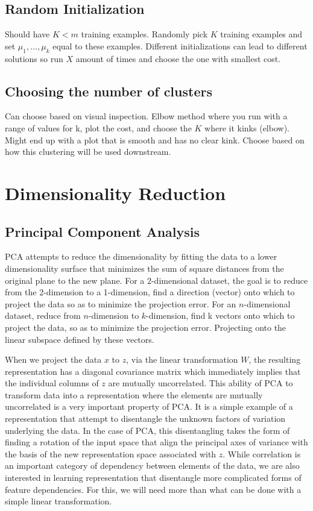 \documentclass[12pt]{article}
\begin{document}
\subsection{Random Initialization}
Should have $K<m$ training examples. Randomly pick $K$ training examples and set $\mu_1,...,\mu_k$ equal to these examples. Different initializations can lead to different solutions so run $X$ amount of times and choose the one with smallest cost.

\subsection{Choosing the number of clusters}
Can choose based on visual inspection. Elbow method where you run with a range of values for k, plot the cost, and choose the $K$ where it kinks (elbow). Might end up with a plot that is smooth and has no clear kink. Choose based on how this clustering will be used downstream.

\section{Dimensionality Reduction}
\subsection{Principal Component Analysis}
PCA attempts to reduce the dimensionality by fitting the data to a lower dimensionality surface that minimizes the sum of square distances from the original plane to the new plane. For a 2-dimensional dataset, the goal is to reduce from the 2-dimension to a 1-dimension, find a direction (vector) onto which to project the data so as to minimize the projection error. For an $n$-dimensional dataset, reduce from $n$-dimension to $k$-dimension, find k vectors onto which to project the data, so as to minimize the projection error. Projecting onto the linear subspace defined by these vectors.

When we project the data $x$ to $z$, via the linear transformation $W$, the resulting representation has a diagonal covariance matrix which immediately implies that the individual columns of $z$ are mutually uncorrelated.  This ability of PCA to transform data into a representation where the elements are mutually uncorrelated is a very important property of PCA. It is a simple example of a representation that attempt to disentangle the unknown factors of variation underlying the data. In the case of PCA, this disentangling takes the form of finding a rotation of the input space that align the principal axes of variance with the basis of the new representation space associated with $z$. While correlation is an important category of dependency between elements of the data, we are also interested in learning representation that disentangle more complicated forms of feature dependencies. For this, we will need more than what can be done with a simple linear transformation.
\end{document}

